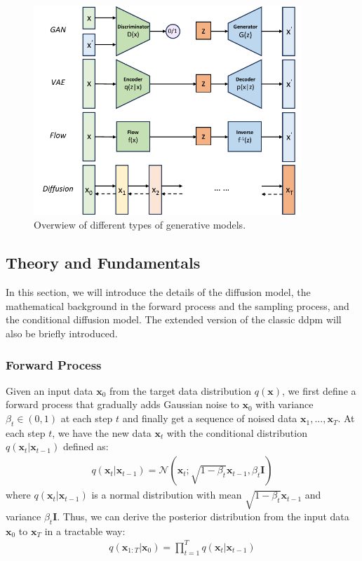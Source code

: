 \documentclass[12pt,DIV14,BCOR12mm,a4paper,footinclude=false,headinclude,parskip=half-,twoside,openright,cleardoublepage=empty,toc=index,bibliography=totoc,listof=totoc]{scrreprt}
\numberwithin{equation}{chapter}
\begin{document}
\begin{figure}[h]
	\centering
	\includegraphics[width=0.9\textwidth]{img/gen.pdf}
	\caption{Overwiew of different types of generative models.}
	\label{img:gen}
\end{figure}

\subsection{Theory and Fundamentals}\label{sec:theory}
In this section, we will introduce the details of the diffusion model, the mathematical background in the forward process and the sampling process, and the conditional diffusion model. The extended version of the classic \gls{ddpm} will also be briefly introduced.

\subsubsection{Forward Process}
Given an input data $\mathbf{x}_{0}$ from the target data distribution $q(\mathbf{x})$, we first define a forward process that gradually adds Gaussian noise to $\mathbf{x}_{0}$ with variance $\beta_{t}\in (0, 1)$ at each step $t$ and finally get a sequence of noised data $\mathbf{x}_{1},...,\mathbf{x}_{T}$. At each step $t$, we have the new data $\mathbf{x}_{t}$ with the conditional distribution $q(\mathbf{x}_{t}|\mathbf{x}_{t-1})$ defined as:
\begin{align}
  q(\mathbf{x}_{t}|\mathbf{x}_{t-1}) = \mathcal{N}(\mathbf{x}_{t}; \sqrt{1-\beta_{t}}\mathbf{x}_{t-1}, \beta_{t}\mathbf{I})
\end{align}
where $q(\mathbf{x}_{t}|\mathbf{x}_{t-1})$ is a normal distribution with mean $\sqrt{1-\beta_{t}}\mathbf{x}_{t-1}$ and variance $\beta_{t}\mathbf{I}$. Thus, we can derive the posterior distribution from the input data $\mathbf{x}_{0}$ to $\mathbf{x}_{T}$ in a tractable way:
\begin{align}
  q(\mathbf{x}_{1:T}|\mathbf{x}_{0}) = \prod_{t=1}^{T}q(\mathbf{x}_{t}|\mathbf{x}_{t-1})
\end{align}
\end{document}
